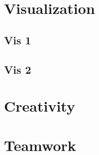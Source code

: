 \documentclass[12pt, oneside]{article}
\begin{document}
\section{Visualization}
\subsection{Vis 1}

\subsection{Vis 2}

\section{Creativity}

\section{Teamwork}
\end{document}
